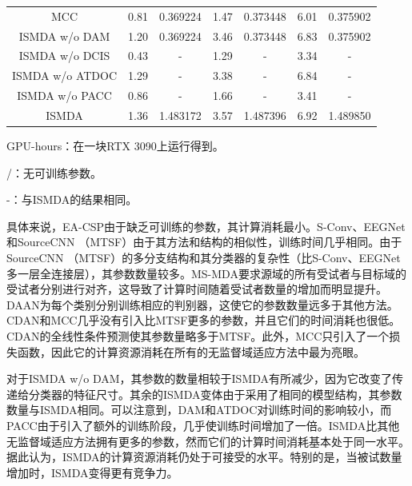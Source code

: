 \begin{table}[!h]
{\begin{threeparttable}
{\begin{tabular}{ccccccc}
        MCC                        & 0.81             & 0.369224   & 1.47             & 0.373448   & 6.01             & 0.375902 \\
        
        ISMDA w/o DAM              & 1.20             & 0.369224   & 3.46             & 0.373448   & 6.83             & 0.375902 \\
        
        ISMDA w/o DCIS             & 0.43             & -          & 1.29             & -          & 3.34             & -       \\
        
        ISMDA w/o ATDOC            & 1.29             & -          & 3.38             & -          & 6.84             & -       \\
        
        ISMDA w/o PACC             & 0.86             & -          & 1.66             & -          & 3.41             & -       \\
     
        ISMDA                      & 1.36             & 1.483172   & 3.57             & 1.487396   & 6.92             & 1.489850 \\
        \bottomrule
    \end{tabular}
    }
    \begin{tablenotes}
	    \footnotesize
	    \item GPU-hours：在一块RTX 3090上运行得到。
	    \item /：无可训练参数。
	    \item -：与ISMDA的结果相同。
    \end{tablenotes}
\end{threeparttable}
}
\end{table}

具体来说，EA-CSP由于缺乏可训练的参数，其计算消耗最小。S-Conv、EEGNet和SourceCNN （MTSF）由于其方法和结构的相似性，训练时间几乎相同。由于SourceCNN （MTSF）的多分支结构和其分类器的复杂性（比S-Conv、EEGNet多一层全连接层），其参数数量较多。MS-MDA要求源域的所有受试者与目标域的受试者分别进行对齐，这导致了计算时间随着受试者数量的增加而明显提升。DAAN为每个类别分别训练相应的判别器，这使它的参数数量远多于其他方法。CDAN和MCC几乎没有引入比MTSF更多的参数，并且它们的时间消耗也很低。CDAN的全线性条件预测使其参数量略多于MTSF。此外，MCC只引入了一个损失函数，因此它的计算资源消耗在所有的无监督域适应方法中最为亮眼。

对于ISMDA w/o DAM，其参数的数量相较于ISMDA有所减少，因为它改变了传递给分类器的特征尺寸。其余的ISMDA变体由于采用了相同的模型结构，其参数数量与ISMDA相同。可以注意到，DAM和ATDOC对训练时间的影响较小，而PACC由于引入了额外的训练阶段，几乎使训练时间增加了一倍。ISMDA比其他无监督域适应方法拥有更多的参数，然而它们的计算时间消耗基本处于同一水平。据此认为，ISMDA的计算资源消耗仍处于可接受的水平。特别的是，当被试数量增加时，ISMDA变得更有竞争力。

